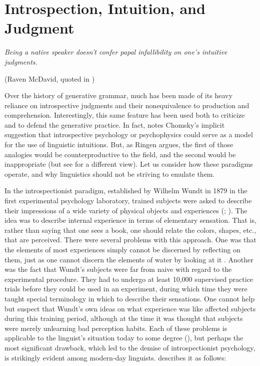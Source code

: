 \section{Introspection, Intuition, and Judgment} \label{sec:2.4}

\epigraph{\textit{Being a native speaker doesn't confer papal infallibility on one's intuitive judgments.\\[-2\baselineskip]}}{(Raven McDavid, quoted in \citealt{Paikeday1985})}

\noindent Over the history of generative grammar, much has been made of its heavy reliance on introspective judgments and their nonequivalence to production and comprehension. Interestingly, this same feature has been used both to criticize and to defend the generative practice. In fact, \citet{Ringen1977} notes Chomsky's implicit suggestion that introspective psychology or psychophysics could serve as a model for the use of linguistic intuitions. But, as Ringen argues, the first of those analogies would be counterproductive to the field, and the second would be inappropriate (but see \citet[6\textendash{}7]{Cowart1997} for a different view). Let
us consider how these paradigms operate, and why linguistics should not be striving to emulate them.

In the introspectionist paradigm, established by Wilhelm Wundt in 1879 in the first experimental psychology laboratory, trained subjects were asked to describe their impressions of a wide variety of physical objects and experiences (\citet{Wundt1896}; \citet{Boring1953}). The idea was to describe internal experience in terms of elementary sensation. That is, rather than saying that one sees a book, one should relate the colors, shapes, etc., that are perceived. There were several problems with this approach. One was that the elements of most experiences simply cannot be discerned by reflecting on them, just as one cannot discern the elements of water by looking at it \citep{Dellarosa1988}. Another was the fact that Wundt's subjects were far from naive with regard to the experimental procedure. They had to undergo at least 10,000 supervised practice trials before they could be used in an experiment, during which time they were taught special terminology in which to describe their sensations. One cannot help but suspect that Wundt's own ideas on what experience was like affected subjects during this training period, although at the time it was thought that subjects were merely unlearning bad perception habits. Each of these problems is applicable to the linguist's situation today to some degree (\citet[vol. 3]{Levelt1974}), but perhaps the most significant drawback, which led to the
demise of introspectionist psychology, is strikingly evident among modern-day linguists. \citet{Dellarosa1988} describes it as follows:

